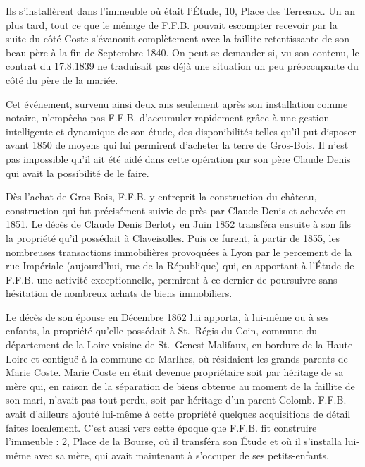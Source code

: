 \documentclass[11pt,a4paper]{report}
\begin{document}
Ils s'installèrent dans l'immeuble où était l'Étude, 10, Place des Terreaux. Un an plus tard, tout ce que le ménage de F.F.B. pouvait escompter recevoir par la suite du côté Coste s'évanouit complètement avec la faillite retentissante de son beau-père à la fin de Septembre 1840. On peut se demander si, vu son contenu, le contrat du 17.8.1839 ne traduisait pas déjà une situation un peu préoccupante du côté du père de la mariée.


Cet événement, survenu ainsi deux ans seulement après son installation comme notaire, n'empêcha pas F.F.B. d'accumuler rapidement grâce à une gestion intelligente et dynamique de son étude, des disponibilités telles qu'il put disposer avant 1850 de moyens qui lui permirent d'acheter la terre de Gros-Bois. Il n'est pas impossible qu'il ait été aidé dans cette opération par son père Claude Denis qui avait la possibilité de le faire.

Dès l'achat de Gros Bois, F.F.B. y entreprit la construction du château, construction qui fut précisément suivie de près par Claude Denis et achevée en 1851. Le décès de Claude Denis Berloty en Juin 1852 transféra ensuite à son fils la propriété qu'il possédait à Claveisolles. Puis ce furent, à partir de 1855, les nombreuses transactions immobilières provoquées à Lyon par le percement de la rue Impériale (aujourd'hui, rue de la République) qui, en apportant à l'Étude de F.F.B. une activité exceptionnelle, permirent à ce dernier de poursuivre sans hésitation de nombreux achats de biens immobiliers.

Le décès de son épouse en Décembre 1862 lui apporta, à lui-même ou à ses enfants, la propriété qu'elle possédait à St.~Régis-du-Coin, commune du département de la Loire voisine de St.~Genest-Malifaux, en bordure de la Haute-Loire et contiguë à la commune de Marlhes, où résidaient les grands-parents de Marie Coste. Marie Coste en était devenue propriétaire soit par héritage de sa mère qui, en raison de la séparation de biens obtenue au moment de la faillite de son mari, n'avait pas tout perdu, soit par héritage d'un parent Colomb. F.F.B. avait d'ailleurs ajouté lui-même à cette propriété quelques acquisitions de détail faites localement. C'est aussi vers cette époque que F.F.B. fit construire l'immeuble : 2, Place de la Bourse, où il transféra son Étude et où il s'installa lui-même avec sa mère, qui avait maintenant à s'occuper de ses petits-enfants.
\end{document}
